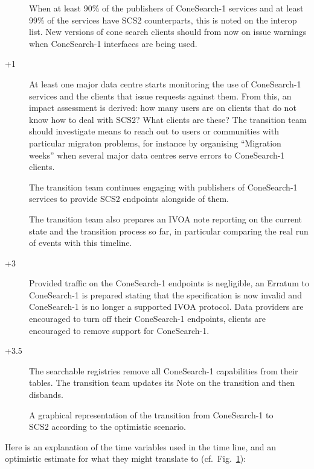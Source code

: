\documentclass[11pt,a4paper]{ivoa}
\begin{document}
\begin{description}
\item[] When at least 90\% of the publishers of ConeSearch-1
services and at least 99\% of the services have SCS2 counterparts, this
is noted on the interop list.  New versions of cone search clients
should from now on issue warnings when ConeSearch-1 interfaces are being
used.

\item[+1] At least one major data centre starts monitoring the
use of ConeSearch-1 services and the clients that issue requests against
them.  From this, an impact assessment is derived: how many users are on
clients that do not know how to deal with SCS2?  What clients are these?
The transition team should investigate means to reach out to users or
communities with particular migraton problems, for instance by
organising ``Migration weeks'' when several major data centres serve
errors to ConeSearch-1 clients.

The transition team continues engaging with publishers of ConeSearch-1
services to provide SCS2 endpoints alongside of them.

The transition team also prepares an IVOA note reporting on the current
state and the transition process so far, in particular comparing the
real run of events with this timeline.

\item[+3] Provided traffic on the ConeSearch-1 endpoints is
negligible, an Erratum to ConeSearch-1 is prepared stating that the
specification is now invalid and ConeSearch-1 is no longer a supported
IVOA protocol.  Data providers are encouraged to turn off their
ConeSearch-1 endpoints, clients are encouraged to remove support for
ConeSearch-1.

\item[+3.5] The searchable registries remove all ConeSearch-1
capabilities from their tables.  The transition team updates its Note on
the transition and then disbands.

\end{description}


\begin{figure}
\caption{A graphical representation of the transition from ConeSearch-1
to SCS2 according to the optimistic scenario.}
\label{fig:timeline}
\end{figure}

Here is an explanation of the time variables used in the time line, and
an optimistic estimate for what they might translate to
(cf.~Fig.~\ref{fig:timeline}):
\end{document}
